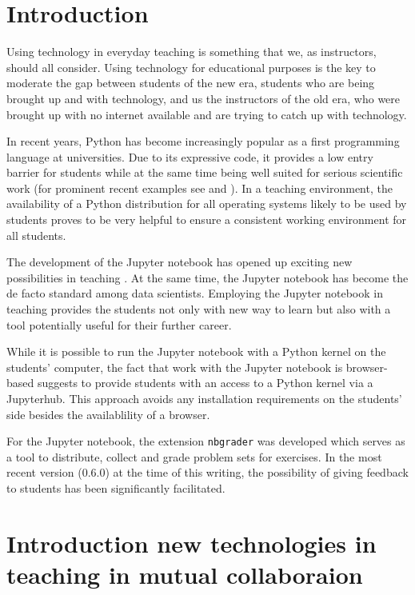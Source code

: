 \documentclass[twocolumn]{svjour3}          %
\begin{document}
\section{Introduction}
\label{intro}

Using technology in everyday teaching is something that we, as instructors, 
should all consider. Using technology for educational purposes is the key to moderate 
the gap between students of the new era, students who are being brought up and with 
technology, and us the instructors of the old era, who were brought up with no internet 
available and are trying to catch up with technology. 
 
In recent years, Python has become increasingly popular as a first programming
language at universities. Due to its expressive code, it provides a low entry
barrier for students while at the same time being well suited for serious
scientific work (for prominent recent examples see \cite{gw150914} and
\cite{EHT}). In a teaching environment, the availability of a Python
distribution for all operating systems likely to be used by students proves to
be very helpful to ensure a consistent working environment for all students.

 
The development of the Jupyter notebook has opened up exciting new
possibilities in teaching \cite{jupyter-edu-book}. At the same time,
the Jupyter notebook has become the de facto standard among data
scientists. Employing the Jupyter notebook in teaching provides the
students not only with new way to learn but also with a tool potentially
useful for their further career.

While it is possible to run the Jupyter notebook with a Python kernel on the
students' computer, the fact that work with the Jupyter notebook is browser-based
suggests to provide students with an access to a Python kernel via a Jupyterhub.
This approach avoids any installation requirements on the students' side besides
the availablility of a browser.

For the Jupyter notebook, the extension \texttt{nbgrader} was developed
\cite{nbgrader} which serves as a tool to distribute, collect and grade problem
sets for exercises. In the most recent version (0.6.0) at the time of this
writing, the possibility of giving feedback to students has been significantly
facilitated.


\section{Introduction new technologies in teaching in mutual collaboraion}
\end{document}
